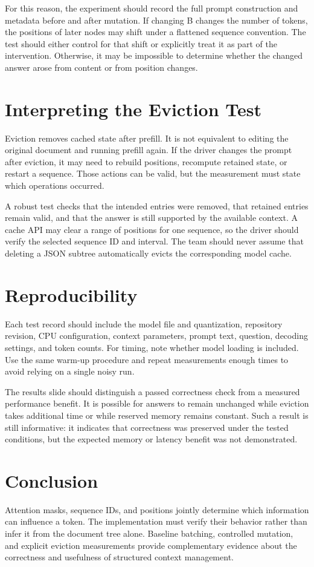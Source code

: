 \documentclass{article}
\begin{document}
For this reason, the experiment should record the full prompt construction and metadata before and after mutation. If changing B changes the number of tokens, the positions of later nodes may shift under a flattened sequence convention. The test should either control for that shift or explicitly treat it as part of the intervention. Otherwise, it may be impossible to determine whether the changed answer arose from content or from position changes.

\section{Interpreting the Eviction Test}
Eviction removes cached state after prefill. It is not equivalent to editing the original document and running prefill again. If the driver changes the prompt after eviction, it may need to rebuild positions, recompute retained state, or restart a sequence. Those actions can be valid, but the measurement must state which operations occurred.

A robust test checks that the intended entries were removed, that retained entries remain valid, and that the answer is still supported by the available context. A cache API may clear a range of positions for one sequence, so the driver should verify the selected sequence ID and interval. The team should never assume that deleting a JSON subtree automatically evicts the corresponding model cache.

\section{Reproducibility}
Each test record should include the model file and quantization, repository revision, CPU configuration, context parameters, prompt text, question, decoding settings, and token counts. For timing, note whether model loading is included. Use the same warm-up procedure and repeat measurements enough times to avoid relying on a single noisy run.

The results slide should distinguish a passed correctness check from a measured performance benefit. It is possible for answers to remain unchanged while eviction takes additional time or while reserved memory remains constant. Such a result is still informative: it indicates that correctness was preserved under the tested conditions, but the expected memory or latency benefit was not demonstrated.

\section{Conclusion}
Attention masks, sequence IDs, and positions jointly determine which information can influence a token. The implementation must verify their behavior rather than infer it from the document tree alone. Baseline batching, controlled mutation, and explicit eviction measurements provide complementary evidence about the correctness and usefulness of structured context management.
\end{document}

